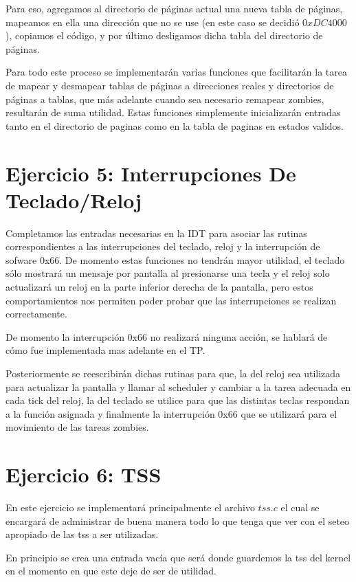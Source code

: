 \documentclass[a4paper]{article}
\begin{document}
Para eso, agregamos al directorio de páginas actual una nueva tabla de páginas, mapeamos en ella una dirección que no se use (en este caso se decidió $0xDC4000$), copiamos el código, y por último desligamos dicha tabla del directorio de páginas.

Para todo este proceso se implementarán varias funciones que facilitarán la tarea de mapear y desmapear tablas de páginas a direcciones reales y directorios de páginas a tablas, que más adelante cuando sea necesario remapear zombies, resultarán de suma utilidad. Estas funciones simplemente inicializarán entradas tanto en el directorio de paginas como en la tabla de paginas en estados validos.

\section{Ejercicio 5: Interrupciones De Teclado/Reloj}
%

Completamos las entradas necesarias en la IDT para asociar las rutinas correspondientes a las interrupciones del teclado, reloj y la interrupción de sofware 0x66. De momento estas funciones no tendrán mayor utilidad, el teclado sólo mostrará un mensaje por pantalla al presionarse una tecla y el reloj solo actualizará un reloj en la parte inferior derecha de la pantalla, pero estos comportamientos nos permiten poder probar que las interrupciones se realizan correctamente.

De momento la interrupción 0x66 no realizará ninguna acción, se hablará de cómo fue implementada mas adelante en el TP.

Posteriormente se reescribirán dichas rutinas para que, la del reloj sea utilizada para actualizar la pantalla y llamar al scheduler y cambiar a la tarea adecuada en cada tick del reloj, la del teclado se utilice para que las distintas teclas respondan a la función asignada y finalmente la interrupción 0x66 que se utilizará para el movimiento de las tareas zombies.

\section{Ejercicio 6: TSS}

En este ejercicio se implementará principalmente el archivo $tss.c$ el cual se encargará de administrar de buena manera todo lo que tenga que ver con el seteo apropiado de las tss a ser utilizadas.

En principio se crea una entrada vacía que será donde guardemos la tss del kernel en el momento en que este deje de ser de utilidad.
\end{document}
